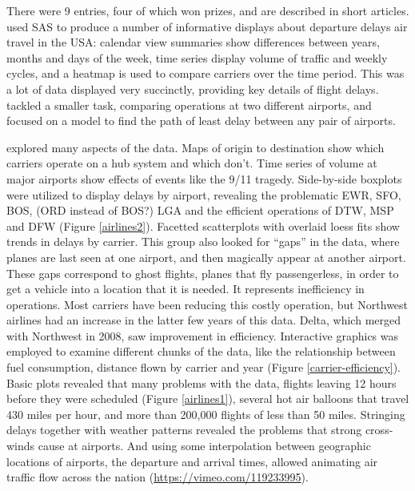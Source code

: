 \documentclass{article}
\begin{document}
There were 9 entries, four of which won prizes, and are described in short articles. \citet{expo-wicklin} used SAS to produce a number of informative displays about departure delays air travel in the USA: calendar view summaries show differences between years, months and days of the week, time series display volume of traffic and weekly cycles, and a heatmap is used to compare carriers over the time period. This was a lot of data displayed very succinctly, providing key details of flight delays. \citet{expo-wickham} tackled a smaller task, comparing operations at two different airports, and \citet{expo-dey} focused on a model to find the path of least delay between any pair of airports.

\citet{expo-hofmann} explored many aspects of the data. Maps of origin to destination show which carriers operate on a hub system and which don't. Time series of volume at major airports show effects of events like the 9/11 tragedy. Side-by-side boxplots were utilized to display delays by airport, revealing the problematic EWR, SFO, BOS,{\color[rgb]{0,0,1} (ORD instead of BOS?) } LGA and the efficient operations of DTW, MSP and DFW (Figure \ref{airlines2}). Facetted scatterplots with overlaid loess fits show trends in delays by carrier. This group also looked for ``gaps'' in the data, where planes are last seen at one airport, and then magically appear at another airport. These gaps correspond to ghost flights, planes that fly passengerless, in order to get a vehicle into a location that it is needed. It represents inefficiency in operations. Most carriers have been reducing this costly operation, but Northwest airlines had an increase in the latter few years of this data. Delta, which merged with Northwest in 2008, saw improvement in efficiency. Interactive graphics was employed to examine different chunks of the data, like the relationship between fuel consumption, distance flown by carrier and year (Figure \ref{carrier-efficiency}). Basic plots revealed that many problems with the data, flights leaving 12 hours before they were scheduled (Figure \ref{airlines1}), several hot air balloons that travel 430 miles per hour, and more than 200,000 flights of less than 50 miles. Stringing delays together with weather patterns revealed the problems that strong cross-winds cause at airports. And using some interpolation between geographic locations of airports, the departure and arrival times, allowed animating air traffic flow across the nation (\url{https://vimeo.com/119233995}).
\end{document}
